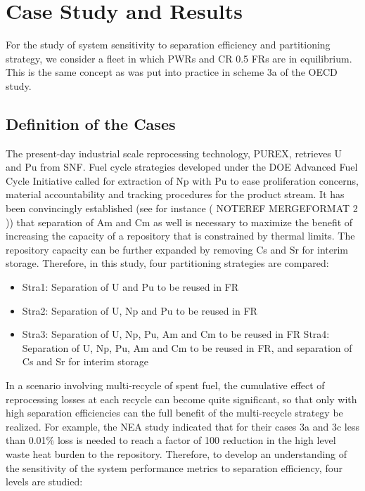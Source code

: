 \section{Case Study and Results}
\label{ses_sec:case_study}
For the study of system sensitivity to separation efficiency and
partitioning strategy, we consider a fleet in which PWRs and CR 0.5 FRs
are in equilibrium.  This is the same concept as was put into practice
in scheme 3a of the OECD study.


\subsection{Definition of the Cases}
\label{ses_sec:case_def}
The present-day industrial scale reprocessing technology, PUREX,
retrieves U and Pu from SNF. Fuel cycle strategies developed under the
DOE Advanced Fuel Cycle Initiative called for extraction of Np with Pu
to ease proliferation concerns, material accountability and tracking
procedures for the product stream. It has been convincingly established
(see for instance (  NOTEREF 
MERGEFORMAT  2 )) that separation of Am and Cm as well is necessary to
maximize the benefit of increasing the capacity of a repository that is
constrained by thermal limits.  The repository capacity can be further
expanded by removing Cs and Sr for interim storage. Therefore, in this
study, four partitioning strategies are compared:

\begin{itemize}
    \item Stra1: Separation of U and Pu to be reused in FR
    \item Stra2: Separation of U, Np and Pu to be reused in FR
    \item Stra3: Separation of U, Np, Pu, Am and Cm to be reused in FR
    \tiem Stra4: Separation of U, Np, Pu, Am and Cm to be reused in FR, and
          separation of Cs and Sr for interim storage
\end{itemize}

In a scenario involving multi-recycle of spent fuel, the cumulative
effect of reprocessing losses at each recycle can become quite
significant, so that only with high separation efficiencies can the full
benefit of the multi-recycle strategy be realized.  For example, the NEA
study indicated that for their cases 3a and 3c less than 0.01\% loss is
needed to reach a factor of 100 reduction in the high level waste heat
burden to the repository.  Therefore, to develop an understanding of the
sensitivity of the system performance metrics to separation efficiency,
four levels are studied:

